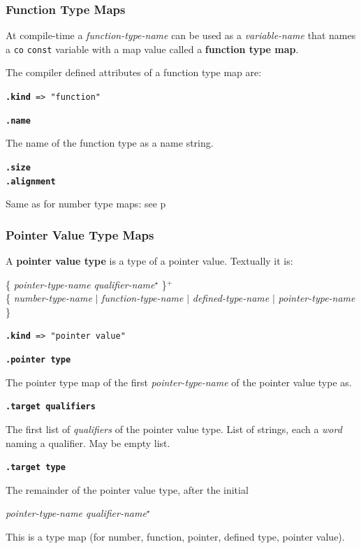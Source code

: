\documentclass[12pt]{article}
\newcommand{\STAR}{{\Large $^\star$}}
\newcommand{\PLUS}[1][]{{$^{+#1}$}}
\newcommand{\key}[1]{{\rm \bfseries #1}}
\newcommand{\ttkey}[1]{{\tt \bfseries #1}}
\newcommand{\pagref}[1]{p\pageref{#1}}
\newenvironment{indpar}[1][0.3in]%
	{\begin{list}{}%
		     {\setlength{\itemsep}{0in}%
		      \setlength{\topsep}{0in}%
		      \setlength{\parsep}{1ex}%
		      \setlength{\labelwidth}{#1}%
		      \setlength{\leftmargin}{#1}%
		      \addtolength{\leftmargin}{\labelsep}}%
	 \item}%
	{\end{list}}
\begin{document}
\subsubsection{Function Type Maps}
\label{FUNCTION-TYPE-MAPS}

At compile-time a {\em function-type-name} can be used as a
{\em variable-name} that names a {\tt co} {\tt const} variable
with a map value called a \key{function type map}.

The compiler defined attributes of a function type map are:

{\tt \ttkey{.kind} => "function"}

\ttkey{.name}
\begin{indpar}
The name of the function type as a name string.
\end{indpar}

\ttkey{.size} \\
\ttkey{.alignment}
\begin{indpar}
Same as for number type maps: see \pagref{SIZE-AND-ALIGNMENT}
\end{indpar}

\subsubsection{Pointer Value Type Maps}
\label{POINTER-VALUE-TYPE-MAPS}

A \key{pointer value type} is a type of a pointer value.
Textually it is:

\hspace*{0.2in}\{ {\em pointer-type-name} {\em qualifier-name}\STAR{}
               \}\PLUS{} \\
\hspace*{0.4in}\{ {\em number-type-name} $|$ {\em function-type-name}
			  $|$ {\em defined-type-name}
			  $|$ {\em pointer-type-name} \}

{\tt \ttkey{.kind} => "pointer value"}

\ttkey{.pointer type}
\begin{indpar}
The pointer type map of the first {\em pointer-type-name}
of the pointer value type as.
\end{indpar}

\ttkey{.target qualifiers}
\begin{indpar}
The first list of {\em qualifiers} of the pointer value type.
List of strings, each a {\em word} naming a qualifier.
May be empty list.
\end{indpar}

\ttkey{.target type}
\begin{indpar}
The remainder of the pointer value type, after the initial
\begin{center}
{\em pointer-type-name} {\em qualifier-name}\STAR{}
\end{center}
This is a type map (for number, function, pointer,
defined type,
pointer value).
\end{indpar}
\end{document}
